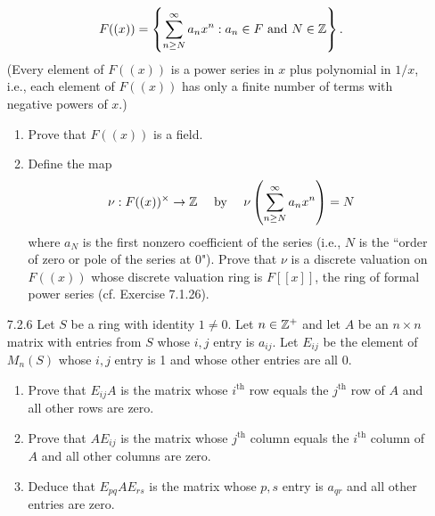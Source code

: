 \begin{enumerate}
                  $$F((x)) = \left\{\sum_{n \ge N}^\infty a_nx^n : a_n \in F
                    \text{ and } N \in \mathbb{Z}\right\}.$$
                  (Every element of $F((x))$ is a power series in $x$ plus
                  polynomial in $1/x$, i.e., each element of $F((x))$ has only a
                  finite number of terms with negative powers of $x$.)
                  \begin{enumerate}
                     \item Prove that $F((x))$ is a field.
                     \item Define the map
                           $$\nu : F((x))^\times \rightarrow \mathbb{Z} \quad\text{ by }
                             \quad\nu\left(\sum_{n \ge N}^\infty
                              a_nx^n\right) = N$$
                           where $a_N$ is the first nonzero coefficient of the
                           series (i.e., $N$ is the ``order of zero or pole of
                           the series at 0"). Prove that $\nu$ is a discrete
                           valuation on $F((x))$ whose discrete valuation ring
                           is $F[[x]]$, the ring of formal power series
                           (cf. Exercise 7.1.26).
                  \end{enumerate}
   \item[7.2.6]   Let $S$ be a ring with identity $1 \neq 0$. Let $n \in \mathbb{Z}^+$ 
                  and let $A$ be an $n \times n$ matrix with entries from $S$
                  whose $i, j$ entry is $a_{ij}$. Let $E_{ij}$ be the element of
                  $M_n(S)$ whose $i, j$ entry is 1 and whose other entries are
                  all 0.
                  \begin{enumerate}
                     \item Prove that $E_{ij}A$ is the matrix whose
                           $i^{\text{th}}$ row equals the $j^{\text{th}}$ row of
                           $A$ and all other rows are zero.
                     \item Prove that $AE_{ij}$ is the matrix whose
                           $j^{\text{th}}$ column equals the $i^{\text{th}}$
                           column of $A$ and all other columns are zero.
                     \item Deduce that $E_{pq}AE_{rs}$ is the matrix whose
                           $p, s$ entry is $a_{qr}$ and all other entries are
                           zero.
                  \end{enumerate}

\end{enumerate}
